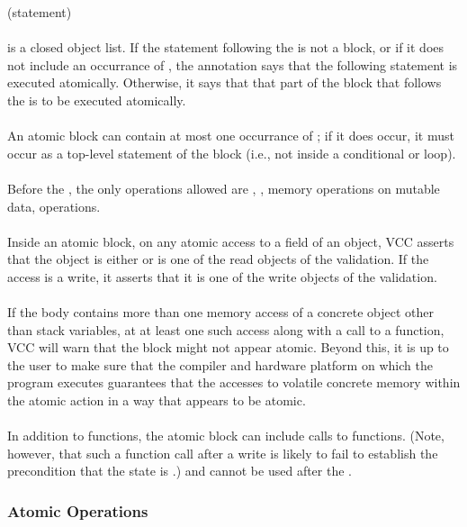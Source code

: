 \documentclass[preprint,nocopyrightspace]{sigplanconf}
\begin{document}
{{{ (statement)\\
\\
 is a closed object list. If the statement following
the  is not a block, or if it does not include
an occurrance of , the annotation says that the
following statement is executed atomically. Otherwise, it says that
that part of the block that follows the  is to be
executed atomically. 
\\\\
An atomic block can contain at most one occurrance of ;
if it does occur, it must occur as a top-level statement of the block
(i.e., not inside a conditional or loop). 
\\\\
Before the , the only operations allowed
are , , memory operations on mutable data,
 operations. 
\\\\
Inside an atomic block, on any atomic access to a field of an object,
VCC asserts that the object is either \vcc{\mutable} or is one of the
read objects of the validation. If the access is a write, it asserts
that it is one of the write objects of the validation.
\\\\
If the body contains more than one memory access of a concrete object
other than stack variables, at at least one such access along with a
call to a  function, VCC will warn that the block might
not appear atomic. Beyond this, it is up to the user to make sure that the
compiler and hardware platform on which the program executes guarantees that 
the accesses to volatile concrete memory within the
atomic action in a way that appears to be atomic. 
\\\\
In addition to  functions, the atomic block can
include calls to  functions. (Note, however, that such a
function call after a write is likely to fail to establish the
precondition that the state is .) 
and  cannot be used after the .

\subsubsection{Atomic Operations}

}}}
\end{document}
